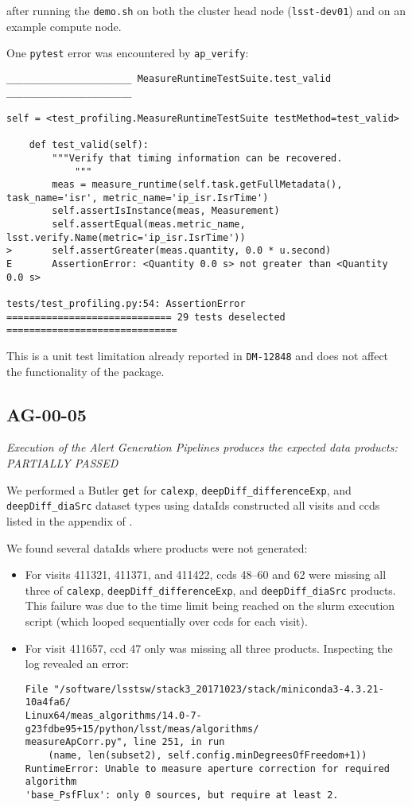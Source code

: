 \documentclass[DM,lsstdraft,STR,toc]{lsstdoc}
\begin{document}
after running the \texttt{demo.sh} on both the cluster head node (\texttt{lsst-dev01}) and on an example compute node.

One \texttt{pytest} error was encountered by \texttt{ap\_verify}:

\begin{verbatim}
______________________ MeasureRuntimeTestSuite.test_valid ______________________

self = <test_profiling.MeasureRuntimeTestSuite testMethod=test_valid>

    def test_valid(self):
        """Verify that timing information can be recovered.
            """
        meas = measure_runtime(self.task.getFullMetadata(), task_name='isr', metric_name='ip_isr.IsrTime')
        self.assertIsInstance(meas, Measurement)
        self.assertEqual(meas.metric_name, lsst.verify.Name(metric='ip_isr.IsrTime'))
>       self.assertGreater(meas.quantity, 0.0 * u.second)
E       AssertionError: <Quantity 0.0 s> not greater than <Quantity 0.0 s>

tests/test_profiling.py:54: AssertionError
============================= 29 tests deselected ==============================\end{verbatim}

This is a unit test limitation already reported 
in \texttt{DM-12848} and does not affect the functionality of the package.

\subsection{AG-00-05}

\textit{Execution of the Alert Generation Pipelines produces the expected data products: PARTIALLY PASSED}

We performed a Butler \texttt{get} for \texttt{calexp}, \texttt{deepDiff\_differenceExp}, and \texttt{deepDiff\_diaSrc} dataset types using 
dataIds constructed all visits and ccds listed in the appendix of .

We found several dataIds where products were not generated:  

\begin{itemize}
	\item For visits 411321, 411371, and 411422, ccds 48--60 and 62 were missing all three of \texttt{calexp}, \texttt{deepDiff\_differenceExp}, and \texttt{deepDiff\_diaSrc} products.  This failure was due to the time limit being reached on the slurm execution script (which looped sequentially over ccds for each visit).
	\item For visit 411657, ccd 47 only was missing all three products.  Inspecting the log revealed an error:
		\begin{verbatim}  
File "/software/lsstsw/stack3_20171023/stack/miniconda3-4.3.21-10a4fa6/
Linux64/meas_algorithms/14.0-7-g23fdbe95+15/python/lsst/meas/algorithms/
measureApCorr.py", line 251, in run
    (name, len(subset2), self.config.minDegreesOfFreedom+1))
RuntimeError: Unable to measure aperture correction for required algorithm 
'base_PsfFlux': only 0 sources, but require at least 2.
\end{verbatim}
\end{itemize}
\end{document}
